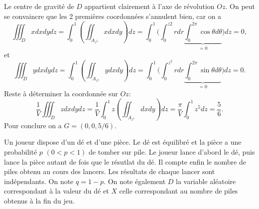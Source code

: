 \documentclass[a4paper]{tp_um}
\begin{document}
\begin{enumerate}
\bigskip


    Le centre de gravité de $D$ appartient clairement à l'axe de révolution $Oz$. On peut se convaincre que les 2 premières coordonnées s'annulent bien, car on a 
    \[
        \iiint_D x dxdydz =  \int_0^1 \left( \iint_{A_{z^2}} x dxdy \right)dz =  \int_0^1 \big( \int_0^{z2} r dr \underbrace{\int_0^{2\pi} \cos \theta d\theta}_{=0} \big ) dz =0, 
    \]
    et
    \[
        \iiint_D y dxdydz =  \int_0^1 \left( \iint_{A_{z^2}} y dxdy \right)dz =  \int_0^1 \big( \int_0^{z^2} r dr \underbrace{\int_0^{2\pi} \sin \theta d\theta}_{=0} \big ) dz =0 .
    \]
Reste à déterminer la coordonnée sur $Oz$:
\[
   \frac 1V \iiint_D z dxdydz = \frac 1V \int_0^1 z \left( \iint_{A_{z^2}} dxdy \right)dz = \frac \pi V \int_0^1 z^5 dz =  \frac 5 6.
\]
Pour conclure on a $G = (0,0,5/6)$.
\end{enumerate}

\bigskip


\exo{} Un joueur dispose d'un dé et d'une pièce. Le dé est équilibré et la pièce a une probabilité $p$ $(0 < p < 1)$ de tomber sur pile. Le joueur lance d'abord le dé, puis lance la pièce autant de fois que le résutlat du dé.  Il compte enfin le nombre de piles obtenu au cours des lancers. Les résultats de chaque lancer sont indépendants. On note $q= 1-p$.  On note également $D$ la variable aléatoire correspondant à la valeur du dé et $X$ celle correspondant au nombre de piles obtenus à la fin du jeu.
\end{document}
